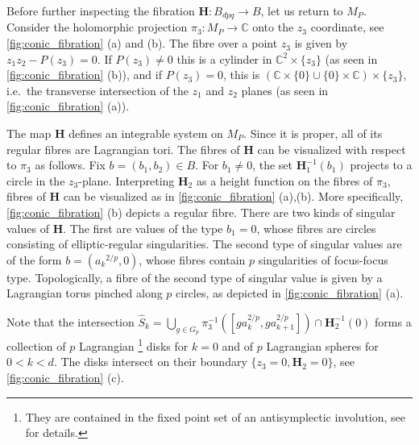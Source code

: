 \documentclass[12pt,a4paper,draft]{scrartcl}
\begin{document}
Before further inspecting the fibration $\symbf{H} \colon B_{dpq} → B$, let us return to $M_P$. Consider the holomorphic projection $π_3 \colon M_P → ℂ$ onto the $z_3$ coordinate, see \cref{fig:conic_fibration} (a) and (b).
The fibre over a point $z_3$ is given by $z_1 z_2 - P(z_3) = 0$. If $P(z_3) ≠ 0$ this is a cylinder in $ℂ^2 × \{z_3\}$ (as seen in \cref{fig:conic_fibration} (b)), and if $P(z_3) = 0$, this is $(ℂ × \{0\} ∪ \{0\} × ℂ) × \{z_3\}$, i.e.\ the transverse intersection of the $z_1$ and $z_2$ planes (as seen in \cref{fig:conic_fibration} (a)).

The map $\mathbf{H}$ defines an integrable system on $M_P$. Since it is proper, all of its regular fibres are Lagrangian tori. The fibres of $\mathbf{H}$ can be visualized with respect to $π_3$ as follows. Fix $b = (b_1,b_2) ∈ B$. For $b_1 ≠ 0$, the set $\symbf{H}_1^{-1}(b_1)$ projects to a circle in the $z_3$-plane. Interpreting $\symbf{H}_2$ as a height function on the fibres of $π_3$, fibres of $\mathbf{H}$ can be visualized as in \cref{fig:conic_fibration} (a),(b). More specifically, \cref{fig:conic_fibration} (b) depicts a regular fibre. There are two kinds of singular values of $\symbf{H}$. The first are values of the type $b_1 = 0$, whose fibres are circles consisting of elliptic-regular singularities. The second type of singular values are of the form $b = ({a_k}^{2/p},0)$, whose fibres contain $p$ singularities of focus-focus type. Topologically, a fibre of the second type of singular value is given by a Lagrangian torus pinched along $p$ circles, as depicted in \cref{fig:conic_fibration} (a). 

Note that the intersection $\hat{S}_k = ⋃_{g ∈ G_p} π_3^{-1}([g a_k^{2/p},g a_{k+1}^{2/p}]) ∩ \symbf{H}_2^{-1}(0)$ forms a collection of $p$ Lagrangian
\footnote{They are contained in the fixed point set of an antisymplectic involution, see \cite[Remark 7.10]{evans2021atfs} for details.}
disks for $k=0$ and of $p$ Lagrangian spheres for $0<k<d$. The disks intersect on their boundary $\{z_3=0,\symbf{H}_2=0\}$, see \cref{fig:conic_fibration} (c).
\end{document}
